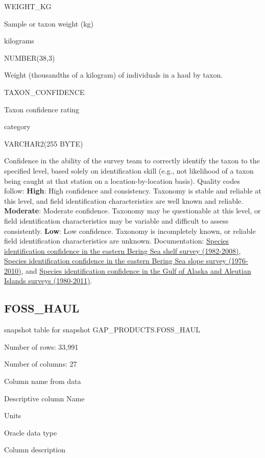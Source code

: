 \documentclass[
  letterpaper,
  oneside,
  open=any]{scrbook}
\begin{document}
WEIGHT\_KG

Sample or taxon weight (kg)

kilograms

NUMBER(38,3)

Weight (thousandths of a kilogram) of individuals in a haul by taxon.

TAXON\_CONFIDENCE

Taxon confidence rating

category

VARCHAR2(255 BYTE)

Confidence in the ability of the survey team to correctly identify the
taxon to the specified level, based solely on identification skill
(e.g., not likelihood of a taxon being caught at that station on a
location-by-location basis). Quality codes follow: \textbf{High}: High
confidence and consistency. Taxonomy is stable and reliable at this
level, and field identification characteristics are well known and
reliable. \textbf{Moderate}: Moderate confidence. Taxonomy may be
questionable at this level, or field identification characteristics may
be variable and difficult to assess consistently. \textbf{Low}: Low
confidence. Taxonomy is incompletely known, or reliable field
identification characteristics are unknown. Documentation:
\href{http://apps-afsc.fisheries.noaa.gov/Publications/ProcRpt/PR2009-04.pdf}{Species
identification confidence in the eastern Bering Sea shelf survey
(1982-2008)},
\href{http://apps-afsc.fisheries.noaa.gov/Publications/ProcRpt/PR2014-05.pdf}{Species
identification confidence in the eastern Bering Sea slope survey
(1976-2010)}, and
\href{http://apps-afsc.fisheries.noaa.gov/Publications/ProcRpt/PR2014-01.pdf}{Species
identification confidence in the Gulf of Alaska and Aleutian Islands
surveys (1980-2011)}.

\subsection{FOSS\_HAUL}\label{foss_haul}

snapshot table for snapshot GAP\_PRODUCTS.FOSS\_HAUL

Number of rows: 33,991

Number of columns: 27

Column name from data

Descriptive column Name

Units

Oracle data type

Column description
\end{document}
